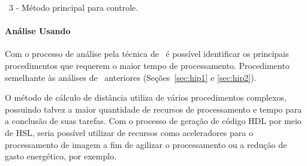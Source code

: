          
         \begin{algorithm}[H]

            \BlankLine
            \BlankLine


            \caption{\Wearable\ 3 - Método principal para controle.}
            \label{alg:wearable3_main}
         \end{algorithm}


      
      \paragraph{Análise Usando \Profile}
      
         Com o processo de análise pela técnica de \profile\ é possível identificar os principais procedimentos que requerem o maior tempo de processamento.
         Procedimento semelhante às análises de \wearables\ anteriores (Seções~\ref{sec:hip1} e \ref{sec:hip2}).
         
         O método de cálculo de distância utiliza de vários procedimentos complexos, possuindo talvez a maior quantidade de recursos de processamento e tempo para a conclusão de suas tarefas.
         Com o processo de geração de código HDL por meio de HSL, seria possível utilizar de recursos como aceleradores para o processamento de imagem a fim de agilizar o processamento ou a redução de gasto energético, por exemplo.


